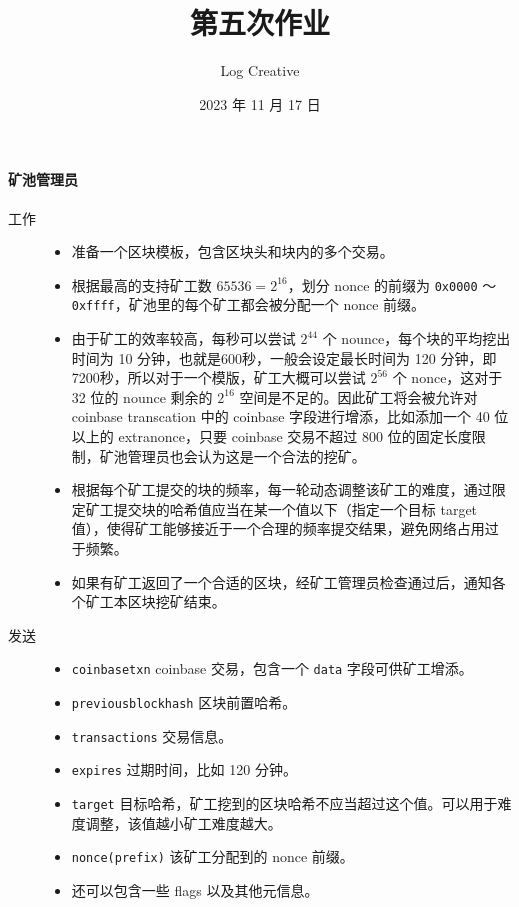 \documentclass{sjtuarticle}
\title{第五次作业}
\author{Log Creative}
\date{2023 年 11 月 17 日}
\begin{document}
\maketitle
\paragraph{矿池管理员}

\begin{description}
    \item[工作] 
\begin{itemize}
    \item 准备一个区块模板，包含区块头和块内的多个交易。
    \item 根据最高的支持矿工数 $65536=2^{16}$，划分 nonce 的前缀为 \verb"0x0000" ～ \verb"0xffff"，矿池里的每个矿工都会被分配一个 nonce 前缀。
    \item 由于矿工的效率较高，每秒可以尝试 $2^{44}$ 个 nounce，每个块的平均挖出时间为 10 分钟，也就是600秒，一般会设定最长时间为 120 分钟，即7200秒，所以对于一个模版，矿工大概可以尝试 $2^{56}$ 个 nonce，这对于 32 位的 nounce 剩余的 $2^{16}$ 空间是不足的。因此矿工将会被允许对 coinbase transcation 中的 coinbase 字段进行增添，比如添加一个 40 位以上的 extranonce，只要 coinbase 交易不超过 800 位的固定长度限制，矿池管理员也会认为这是一个合法的挖矿。%
    \item 根据每个矿工提交的块的频率，每一轮动态调整该矿工的难度，通过限定矿工提交块的哈希值应当在某一个值以下（指定一个目标 target 值），使得矿工能够接近于一个合理的频率提交结果，避免网络占用过于频繁。
    \item 如果有矿工返回了一个合适的区块，经矿工管理员检查通过后，通知各个矿工本区块挖矿结束。
\end{itemize}
\item[发送] \begin{itemize}
    \item \verb"coinbasetxn" coinbase 交易，包含一个 \verb"data" 字段可供矿工增添。
    \item \verb"previousblockhash" 区块前置哈希。
    \item \verb"transactions" 交易信息。
    \item \verb"expires" 过期时间，比如 120 分钟。
    \item \verb"target" 目标哈希，矿工挖到的区块哈希不应当超过这个值。可以用于难度调整，该值越小矿工难度越大。
    \item \verb"nonce(prefix)" 该矿工分配到的 nonce 前缀。
    \item 还可以包含一些 flags 以及其他元信息。
\end{itemize}
\end{description}
\end{document}
